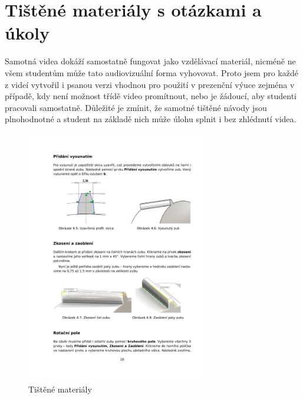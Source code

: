 \section{Tištěné materiály s otázkami a úkoly}
Samotná videa dokáží samostatně fungovat jako vzdělávací materiál, nicméně ne všem studentům může tato audiovizuální forma vyhovovat.
Proto jsem pro každé z videí vytvořil i psanou verzi vhodnou pro použití v prezenční výuce zejména v případě, kdy není možnost třídě video promítnout, nebo je žádoucí, aby studenti pracovali samostatně. 
Důležité je zmínit, že samotné tištěné návody jsou plnohodnotné a student na základě nich může úlohu splnit i bez zhlédnutí videa. 

\begin{figure}[htbp]
    \centering
    \begin{minipage}[b]{0.45\textwidth}
        \centering
        \includegraphics[width=0.7\textwidth]{img/020/guide1.png}
        \caption{Tištěné materiály}
        \label{fig:auxmat1}
    \end{minipage}
    \qquad
    \begin{minipage}[b]{0.45\textwidth}
        \centering

\end{minipage}
\end{figure}

